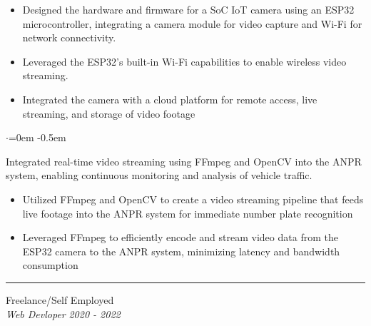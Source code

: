 \documentclass{article}
\begin{document}
\vspace{-1.6em}
\begin{itemize}
    \item Designed the hardware and firmware for a SoC IoT camera using an ESP32 microcontroller, integrating a camera module for video capture and Wi-Fi for network connectivity.
    \item Leveraged the ESP32's built-in Wi-Fi capabilities to enable wireless video streaming. 
    \item Integrated the camera with a cloud platform for remote access, live streaming, and storage of video footage
\end{itemize}


\begin{list}{$\cdot$}{\leftmargin=0em} %
    \itemsep -0.5em \vspace{-0.5em} %
    \item Integrated real-time video streaming using FFmpeg and OpenCV into the ANPR system, enabling continuous monitoring and analysis of vehicle traffic.
    
\end{list}

\vspace{-1.6em}
\begin{itemize}
    \item Utilized FFmpeg and OpenCV to create a video streaming pipeline that feeds live footage into the ANPR system for immediate number plate recognition
    \item Leveraged FFmpeg to efficiently encode and stream video data from the ESP32 camera to the ANPR system, minimizing latency and bandwidth consumption
\end{itemize}

\vspace{1.4em}
\hrule 
\vspace{0.4em}

\hspace{-2.em}
{\bf}Freelance/Self Employed  \hfill {} \\%
{\em Web Devloper} \hfill {\em 2020 - 2022 } %
\end{document}
